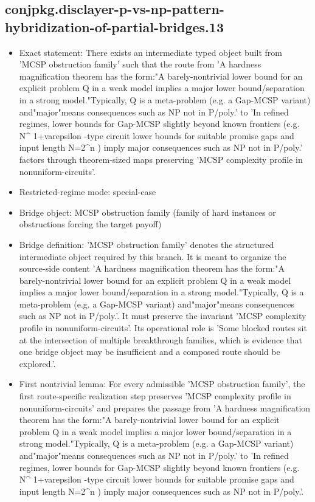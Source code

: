 \documentclass[11pt]{article}
\begin{document}
\subsection*{conjpkg.disclayer-p-vs-np-pattern-hybridization-of-partial-bridges.13}
\begin{itemize}
\item Exact statement: There exists an intermediate typed object built from 'MCSP obstruction family' such that the route from 'A hardness magnification theorem has the form:"A barely-nontrivial lower bound for an explicit problem Q in a weak model implies a major lower bound/separation in a strong model."Typically, Q is a meta-problem (e.g. a Gap-MCSP variant) and"major"means consequences such as NP not in P/poly.' to 'In refined regimes, lower bounds for Gap-MCSP slightly beyond known frontiers (e.g. N\textasciicircum{} 1+varepsilon -type circuit lower bounds for suitable promise gaps and input length N=2\textasciicircum{}n ) imply major consequences such as NP not in P/poly.' factors through theorem-sized maps preserving 'MCSP complexity profile in nonuniform-circuits'.
\item Restricted-regime mode: special-case
\item Bridge object: MCSP obstruction family (family of hard instances or obstructions forcing the target payoff)
\item Bridge definition: 'MCSP obstruction family' denotes the structured intermediate object required by this branch. It is meant to organize the source-side content 'A hardness magnification theorem has the form:"A barely-nontrivial lower bound for an explicit problem Q in a weak model implies a major lower bound/separation in a strong model."Typically, Q is a meta-problem (e.g. a Gap-MCSP variant) and"major"means consequences such as NP not in P/poly.'. It must preserve the invariant 'MCSP complexity profile in nonuniform-circuits'. Its operational role is 'Some blocked routes sit at the intersection of multiple breakthrough families, which is evidence that one bridge object may be insufficient and a composed route should be explored.'.
\item First nontrivial lemma: For every admissible 'MCSP obstruction family', the first route-specific realization step preserves 'MCSP complexity profile in nonuniform-circuits' and prepares the passage from 'A hardness magnification theorem has the form:"A barely-nontrivial lower bound for an explicit problem Q in a weak model implies a major lower bound/separation in a strong model."Typically, Q is a meta-problem (e.g. a Gap-MCSP variant) and"major"means consequences such as NP not in P/poly.' to 'In refined regimes, lower bounds for Gap-MCSP slightly beyond known frontiers (e.g. N\textasciicircum{} 1+varepsilon -type circuit lower bounds for suitable promise gaps and input length N=2\textasciicircum{}n ) imply major consequences such as NP not in P/poly.'.

\end{itemize}
\end{document}
